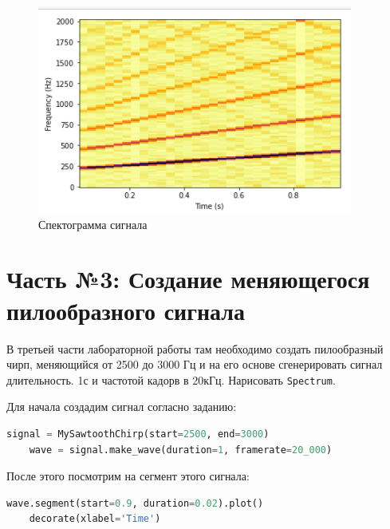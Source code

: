 \documentclass[a4paper]{article}
\begin{document}
            \begin{figure}[H]
                \centering
                \includegraphics{ex_2_spectogramma.png}
                \caption{Спектограмма сигнала}
                \label{fig:ex_2_spectogramma}
            \end{figure}
            
    \newpage
        \section{Часть №3: Создание меняющегося пилообразного сигнала}
            В третьей части лабораторной работы там необходимо создать пилообразный чирп, меняющийся от 2500 до 3000 Гц и на его основе сгенерировать сигнал длительность. 1с и частотой кадорв в 20кГц. Нарисовать \texttt{Spectrum}.
            
            Для начала создадим сигнал согласно заданию:
            
\begin{lstlisting}[language=Python, caption= Создаие согласо задания сигнала]
    signal = MySawtoothChirp(start=2500, end=3000)
    wave = signal.make_wave(duration=1, framerate=20_000)
\end{lstlisting}    
            
            После этого посмотрим на сегмент этого сигнала:
            
\begin{lstlisting}[language=Python, caption= Сегмент сигнала]
    wave.segment(start=0.9, duration=0.02).plot()
    decorate(xlabel='Time')
\end{lstlisting}               
            
\end{document}
